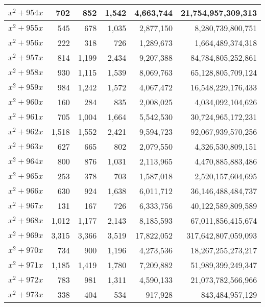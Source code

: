 \documentclass[a4paper]{amsproc}
\theoremstyle{plain}
\begin{document}
\begin{longtable}{ | l | r | r | r | r | r | }
$x^2 + 954x$ & 702 & 852 & 1{,}542 & 4{,}663{,}744 & 21{,}754{,}957{,}309{,}313 \\ \hline
$x^2 + 955x$ & 545 & 678 & 1{,}035 & 2{,}877{,}150 & 8{,}280{,}739{,}800{,}751 \\ \hline
$x^2 + 956x$ & 222 & 318 & 726 & 1{,}289{,}673 & 1{,}664{,}489{,}374{,}318 \\ \hline
$x^2 + 957x$ & 814 & 1{,}199 & 2{,}434 & 9{,}207{,}388 & 84{,}784{,}805{,}252{,}861 \\ \hline
$x^2 + 958x$ & 930 & 1{,}115 & 1{,}539 & 8{,}069{,}763 & 65{,}128{,}805{,}709{,}124 \\ \hline
$x^2 + 959x$ & 984 & 1{,}242 & 1{,}572 & 4{,}067{,}472 & 16{,}548{,}229{,}176{,}433 \\ \hline
$x^2 + 960x$ & 160 & 284 & 835 & 2{,}008{,}025 & 4{,}034{,}092{,}104{,}626 \\ \hline
$x^2 + 961x$ & 705 & 1{,}004 & 1{,}664 & 5{,}542{,}530 & 30{,}724{,}965{,}172{,}231 \\ \hline
$x^2 + 962x$ & 1{,}518 & 1{,}552 & 2{,}421 & 9{,}594{,}723 & 92{,}067{,}939{,}570{,}256 \\ \hline
$x^2 + 963x$ & 627 & 665 & 802 & 2{,}079{,}550 & 4{,}326{,}530{,}809{,}151 \\ \hline
$x^2 + 964x$ & 800 & 876 & 1{,}031 & 2{,}113{,}965 & 4{,}470{,}885{,}883{,}486 \\ \hline
$x^2 + 965x$ & 253 & 378 & 703 & 1{,}587{,}018 & 2{,}520{,}157{,}604{,}695 \\ \hline
$x^2 + 966x$ & 630 & 924 & 1{,}638 & 6{,}011{,}712 & 36{,}146{,}488{,}484{,}737 \\ \hline
$x^2 + 967x$ & 131 & 167 & 726 & 6{,}333{,}756 & 40{,}122{,}589{,}809{,}589 \\ \hline
$x^2 + 968x$ & 1{,}012 & 1{,}177 & 2{,}143 & 8{,}185{,}593 & 67{,}011{,}856{,}415{,}674 \\ \hline
$x^2 + 969x$ & 3{,}315 & 3{,}366 & 3{,}519 & 17{,}822{,}052 & 317{,}642{,}807{,}059{,}093 \\ \hline
$x^2 + 970x$ & 734 & 900 & 1{,}196 & 4{,}273{,}536 & 18{,}267{,}255{,}273{,}217 \\ \hline
$x^2 + 971x$ & 1{,}185 & 1{,}419 & 1{,}780 & 7{,}209{,}882 & 51{,}989{,}399{,}249{,}347 \\ \hline
$x^2 + 972x$ & 783 & 981 & 1{,}311 & 4{,}590{,}133 & 21{,}073{,}782{,}566{,}966 \\ \hline
$x^2 + 973x$ & 338 & 404 & 534 & 917{,}928 & 843{,}484{,}957{,}129 \\ \hline

\end{longtable}
\end{document}
